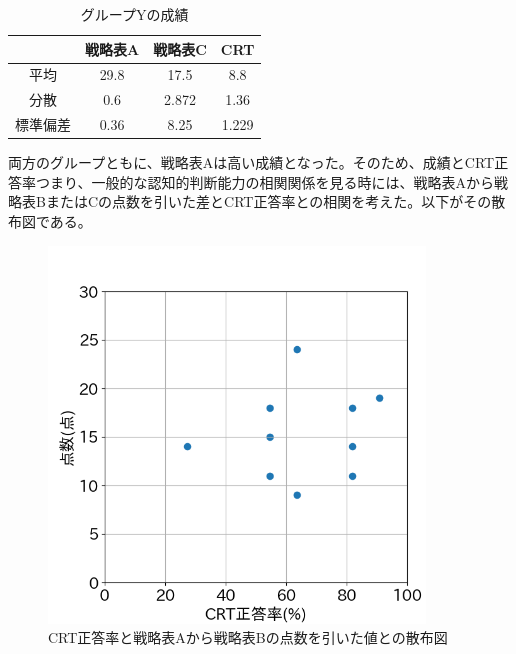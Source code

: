 \begin{table}[H]
    \begin{center}
    \caption{グループYの成績}
    \begin{tabular}{|c|c|c|c|}
    \hline
         & 戦略表A & 戦略表C  & CRT   \\ \hline
    平均   & 29.8 & 17.5  & 8.8   \\ \hline
    分散   & 0.6  & 2.872 & 1.36  \\ \hline
    標準偏差 & 0.36 & 8.25  & 1.229 \\ \hline
    \end{tabular}
    \end{center}
\end{table}
両方のグループともに、戦略表Aは高い成績となった。そのため、成績とCRT正答率つまり、一般的な認知的判断能力の相関関係を見る時には、戦略表Aから戦略表BまたはCの点数を引いた差とCRT正答率との相関を考えた。以下がその散布図である。
\begin{figure}[H]   
    \begin{center}
        \includegraphics[width=10cm]{figure/groupX_crt_diffAB.png}
        \caption{CRT正答率と戦略表Aから戦略表Bの点数を引いた値との散布図}
    \end{center}
\end{figure}

